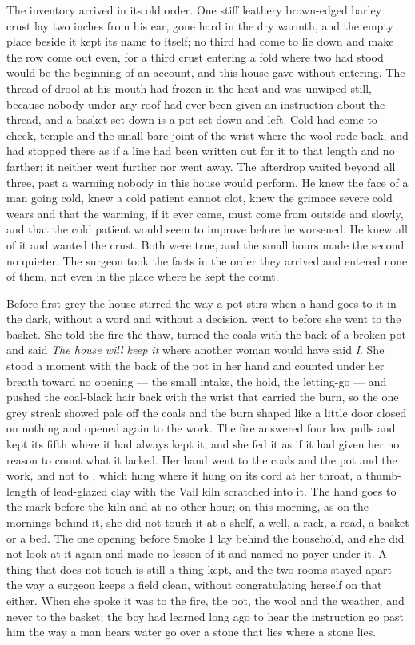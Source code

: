 The inventory arrived in its old order. One stiff leathery brown-edged barley crust lay two inches from his ear, gone hard in the dry warmth, and the empty place beside it kept its name to itself; no third had come to lie down and make the row come out even, for a third crust entering a fold where two had stood would be the beginning of an account, and this house gave without entering. The thread of drool at his mouth had frozen in the heat and was unwiped still, because nobody under any roof had ever been given an instruction about the thread, and a basket set down is a pot set down and left. Cold had come to cheek, temple and the small bare joint of the wrist where the wool rode back, and had stopped there as if a line had been written out for it to that length and no farther; it neither went further nor went away. The afterdrop waited beyond all three, past a warming nobody in this house would perform. He knew the face of a man going cold, knew a cold patient cannot clot, knew the grimace severe cold wears and that the warming, if it ever came, must come from outside and slowly, and that the cold patient would seem to improve before he worsened. He knew all of it and wanted the crust. Both were true, and the small hours made the second no quieter. The surgeon took the facts in the order they arrived and entered none of them, not even in the place where he kept the count.

\scenebreak

Before first grey the house stirred the way a pot stirs when a hand goes to it in the dark, without a word and without a decision.  went to  before she went to the basket. She told the fire the thaw, turned the coals with the back of a broken pot and said \emph{The house will keep it} where another woman would have said \emph{I}. She stood a moment with the back of the pot in her hand and counted under her breath toward no opening --- the small intake, the hold, the letting-go --- and pushed the coal-black hair back with the wrist that carried the burn, so the one grey streak showed pale off the coals and the burn shaped like a little door closed on nothing and opened again to the work. The fire answered four low pulls and kept its fifth where it had always kept it, and she fed it as if it had given her no reason to count what it lacked. Her hand went to the coals and the pot and the work, and not to , which hung where it hung on its cord at her throat, a thumb-length of lead-glazed clay with the Vail kiln scratched into it. The hand goes to the mark before the kiln and at no other hour; on this morning, as on the mornings behind it, she did not touch it at a shelf, a well, a rack, a road, a basket or a bed. The one opening before Smoke 1 lay behind the household, and she did not look at it again and made no lesson of it and named no payer under it. A thing that does not touch is still a thing kept, and the two rooms stayed apart the way a surgeon keeps a field clean, without congratulating herself on that either. When she spoke it was to the fire, the pot, the wool and the weather, and never to the basket; the boy had learned long ago to hear the instruction go past him the way a man hears water go over a stone that lies where a stone lies.

